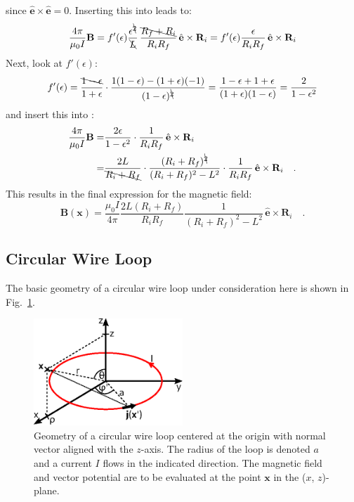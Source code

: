 since $\hat{\mathbf{e}} \times \hat{\mathbf{e}} = 0$.
Inserting this into  leads to:
\begin{equation}
   \frac{4 \pi}{\mu_0 I} \mathbf{B}
 = f'(\epsilon) \frac{\epsilon^{\bcancel{2}}}{\bcancel{L}} \, \frac{\bcancel{R_f+R_i}}{R_i R_f} \, \hat{\mathbf{e}} \times \mathbf{R}_i
 = f'(\epsilon) \frac{\epsilon}{R_i R_f} \, \hat{\mathbf{e}} \times \mathbf{R}_i \label{eqn:B_intermediate_2}
\end{equation}
Next, look at $f'(\epsilon)$:
\begin{equation}
   f'(\epsilon)
 = \frac{\bcancel{1 - \epsilon}}{1 + \epsilon} \cdot \frac{1 (1-\epsilon) - (1+\epsilon) (-1)}{(1 - \epsilon)^{\bcancel{2}}}
 = \frac{1 - \epsilon + 1 + \epsilon}{(1 + \epsilon)(1 - \epsilon)}
 = \frac{2}{1 - \epsilon^2}
\end{equation}
and insert this into :
\begin{align}
   \frac{4 \pi}{\mu_0 I} \mathbf{B}
 = & \frac{2 \epsilon}{1 - \epsilon^2} \cdot \frac{1}{R_i R_f} \, \hat{\mathbf{e}} \times \mathbf{R}_i \\
 = & \frac{2 L}{\bcancel{R_i + R_f}} \cdot \frac{(R_i + R_f)^{\bcancel{2}}}{(R_i + R_f)^2 - L^2} \cdot \frac{1}{R_i R_f} \, \hat{\mathbf{e}} \times \mathbf{R}_i \quad .
\end{align}
This results in the final expression for the magnetic field:
\begin{equation}
 \boxed{\mathbf{B} (\mathbf{x}) = \frac{\mu_0 I}{4 \pi} \frac{2 L (R_i + R_f)}{R_i R_f} \frac{1}{(R_i + R_f)^2 - L^2} \, \hat{\mathbf{e}} \times \mathbf{R}_i } \quad .
\end{equation}

\subsection{Circular Wire Loop}
The basic geometry of a circular wire loop under consideration here is shown in Fig.~\ref{fig:circularWireLoop}.
\begin{figure}[htbp]
 \centering
 \includegraphics[width=0.5\textwidth]{img/circularWireLoop.eps}
 \caption{Geometry of a circular wire loop centered at the origin with normal vector aligned with the $z$-axis.
          The radius of the loop is denoted $a$ and a current $I$ flows in the indicated direction.
          The magnetic field and vector potential are to be evaluated at the point $\mathbf{x}$ in the ($x$, $z$)-plane.}
 \label{fig:circularWireLoop}
\end{figure}

